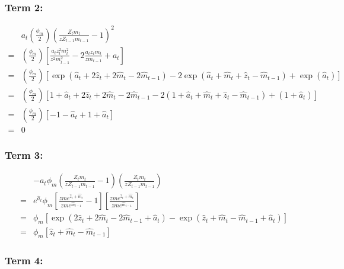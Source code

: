 \documentclass[11pt,preprint, authoryear]{elsarticle}
\numberwithin{equation}{section}
\numberwithin{figure}{section}
\numberwithin{table}{section}
\begin{document}
\hypertarget{term-2-1}{%
\subsubsection{Term 2:}\label{term-2-1}}

\[\begin{aligned}&a_{t}\left(\frac{\phi_{m}}{2}\right)\left(\frac{Z_t m_t }{z Z_{t-1}m_{t-1}}-1\right)^{2}\\
=& \left(\frac{\phi_{m}}{2}\right) \left[ \frac{a_{t} z_{t}^{2} m_{t}^{2}}{z^{2} m_{t-1}^{2}} - 2 \frac{a_{t} z_{t} m_{t}}{z m_{t-1}} + a_{t} \right]\\
=& \left(\frac{\phi_{m}}{2}\right) \left[ \exp(\hat{a}_{t}+2 \hat{z}_{t}+2 \hat{m}_{t}-2 \hat{m}_{t-1})-2 \exp(\hat{a}_{t}+\hat{m}_{t}+\hat{z}_{t}-\hat{m}_{t-1})+ \exp(\hat{a}_{t}) \right] \\
=& \left(\frac{\phi_{m}}{2}\right) \left[ 1 + \hat{a}_{t}+2 \hat{z}_{t}+2 \hat{m}_{t}-2 \hat{m}_{t-1} - 2( 1 + \hat{a}_{t}+\hat{m}_{t}+\hat{z}_{t}-\hat{m}_{t-1}) + (1 + \hat{a}_{t}) \right] \\
=& \left(\frac{\phi_{m}}{2}\right) \left[ -1 - \hat{a}_t + 1 + \hat{a}_t \right]\\
=& 0
\end{aligned}\]

\hypertarget{term-3-1}{%
\subsubsection{Term 3:}\label{term-3-1}}

\[\begin{aligned} &-a_{t} \phi_{m}\left(\frac{Z_t m_t }{z Z_{t-1}m_{t-1}} - 1\right)\left(\frac{Z_t m_t }{z Z_{t-1}m_{t-1}}\right)\\
=& e^{\hat{a}_{t}} \phi_{m}\left[\frac{z m e^{\hat{z}_{t}+\hat{m}_{t}}}{z m e^{\hat{m}_{t-1}}}-1\right]\left[\frac{z m e^{\hat{z}_{t}+\hat{m}_{t}}}{z m e^{\hat{m}_{t-1}}}\right]\\
=& \phi_m \left[ \exp \left(2 \hat{z}_{t}+2 \hat{m}_{t}-2 \hat{m}_{t-1}+\hat{a}_{t}\right)-\exp \left(\hat{z}_{t}+\hat{m}_{t}-\hat{m}_{t-1}+\hat{a}_{t}\right) \right]\\
=& \phi_m \left[\hat{z}_{t}+\hat{m}_{t}-\hat{m}_{t-1}\right]
\end{aligned}\]

\hypertarget{term-4-1}{%
\subsubsection{Term 4:}\label{term-4-1}}
\end{document}
